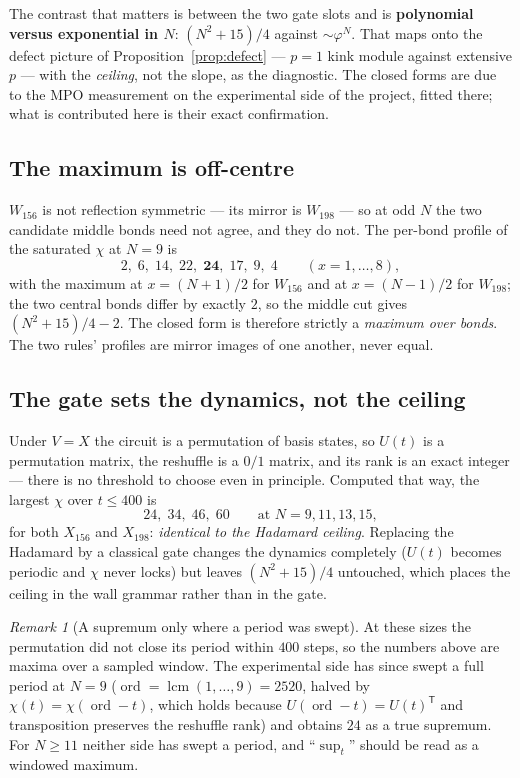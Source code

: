\documentclass[11pt]{article}
\theoremstyle{plain}
\theoremstyle{remark}
\newtheorem{remark}{Remark}
\begin{document}
\noindent The contrast that matters is between the two gate slots and is
\textbf{polynomial versus exponential in $N$}: $(N^2+15)/4$ against
$\sim\varphi^{N}$. That maps onto the defect picture of
Proposition~\ref{prop:defect} --- $p=1$ kink module against extensive $p$ ---
with the \emph{ceiling}, not the slope, as the diagnostic. The closed forms are
due to the MPO measurement on the experimental side of the project, fitted
there; what is contributed here is their exact confirmation.

\subsection{The maximum is off-centre}

$W_{156}$ is not reflection symmetric --- its mirror is $W_{198}$ --- so at odd
$N$ the two candidate middle bonds need not agree, and they do not. The
per-bond profile of the saturated $\chi$ at $N=9$ is
\[
  2,\;6,\;14,\;22,\;\mathbf{24},\;17,\;9,\;4
  \qquad (x=1,\dots,8),
\]
with the maximum at $x=(N{+}1)/2$ for $W_{156}$ and at $x=(N{-}1)/2$ for
$W_{198}$; the two central bonds differ by exactly $2$, so the middle cut gives
$(N^2{+}15)/4-2$. The closed form is therefore strictly a
\emph{maximum over bonds}. The two rules' profiles are mirror images of one
another, never equal.

\subsection{The gate sets the dynamics, not the ceiling}

Under $V=X$ the circuit is a permutation of basis states, so $U(t)$ is a
permutation matrix, the reshuffle is a $0/1$ matrix, and its rank is an exact
integer --- there is no threshold to choose even in principle. Computed that way,
the largest $\chi$ over $t\le400$ is
\[
  24,\;34,\;46,\;60 \qquad\text{at } N=9,11,13,15,
\]
for both $X_{156}$ and $X_{198}$: \emph{identical to the Hadamard ceiling}.
Replacing the Hadamard by a classical gate changes the dynamics completely
($U(t)$ becomes periodic and $\chi$ never locks) but leaves $(N^2{+}15)/4$
untouched, which places the ceiling in the wall grammar rather than in the gate.

\begin{remark}[A supremum only where a period was swept]
At these sizes the permutation did not close its period within $400$ steps, so
the numbers above are maxima over a sampled window. The experimental side has
since swept a full period at $N=9$ ($\operatorname{ord}=\operatorname{lcm}
(1,\dots,9)=2520$, halved by $\chi(t)=\chi(\operatorname{ord}-t)$, which holds
because $U(\operatorname{ord}-t)=U(t)^{\mathsf T}$ and transposition preserves
the reshuffle rank) and obtains $24$ as a true supremum. For $N\ge11$ neither
side has swept a period, and ``$\sup_t$'' should be read as a windowed maximum.
\end{remark}
\end{document}
